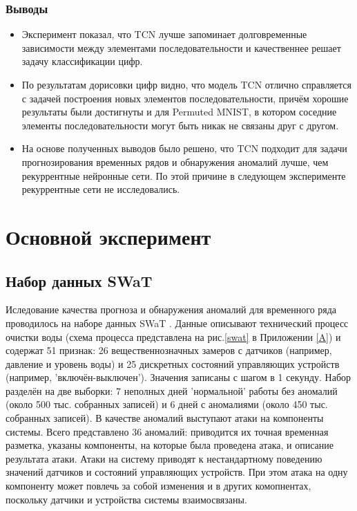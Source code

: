 \documentclass{article}
\begin{document}
\subsubsection{Выводы}
\begin{itemize}
\item Эксперимент показал, что TCN лучше запоминает долговременные зависимости между элементами последовательности и качественнее решает задачу классификации цифр.

\item По результатам дорисовки цифр видно, что модель TCN отлично справляется с задачей построения новых элементов последовательности, причём хорошие результаты были достигнуты и для Permuted MNIST, в котором соседние элементы последовательности могут быть никак не связаны друг с другом.

\item На основе полученных выводов было решено, что TCN подходит для задачи прогнозирования временных рядов и обнаружения аномалий лучше, чем рекуррентные нейронные сети. По этой причине в следующем эксперименте рекуррентные сети не исследовались. 
\end{itemize}

\section{Основной эксперимент}

\subsection{Набор данных SWaT}
Иследование качества прогноза и обнаружения аномалий для временного ряда проводилось на наборе данных SWaT \cite{SWAT}.  Данные описывают технический процесс очистки воды (схема процесса представлена на рис.\ref{swat} в Приложении \ref{A}) и содержат 51 признак: 26 вещественнозначных замеров с датчиков (например, давление и уровень воды) и 25 дискретных состояний управляющих устройств (например, 'включён-выключен'). Значения записаны с шагом в 1 секунду. Набор разделён на две выборки: 7 неполных дней 'нормальной' работы без аномалий (около 500 тыс. собранных записей) и 6 дней с аномалиями (около 450 тыс. собранных записей). В качестве аномалий выступают атаки на компоненты системы. Всего представлено 36 аномалий: приводится их точная временная разметка, указаны компоненты, на которые была проведена атака, и описание результата атаки. Атаки на систему приводят к нестандартному поведению значений датчиков и состояний управляющих устройств. При этом атака на одну компоненту может повлечь за собой изменения и в других комопнентах, поскольку датчики и устройства системы взаимосвязаны. 
\end{document}
